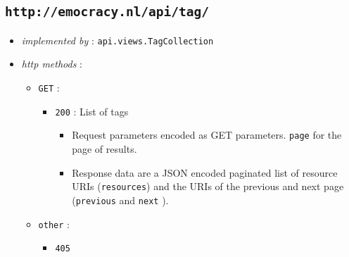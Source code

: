 \documentclass[a4paper]{report}
\begin{document}
\subsection{\texttt{http://emocracy.nl/api/tag/}}
\begin{itemize}
    \item{\textsl{implemented by} : \texttt{api.views.TagCollection}}
    \item{\textsl{http methods} :
        \begin{itemize}
            \item{\texttt{GET} :
                \begin{itemize}
                    \item{\texttt{200} : List of tags}
                    \begin{itemize}
                        \item{Request parameters encoded as GET parameters. 
                        \texttt{page} for the page of results.}
                        \item{Response data are a JSON encoded paginated list of 
                        resource URIs (\texttt{resources}) and the URIs of the 
                        previous and next page (\texttt{previous} and \texttt{next}
                        ).}
                    \end{itemize}
                \end{itemize}
            }
            
            \item{\texttt{other} :
                \begin{itemize}
                    \item{\texttt{405}}
                \end{itemize}
            }
        \end{itemize}
    }
\end{itemize}
\end{document}
